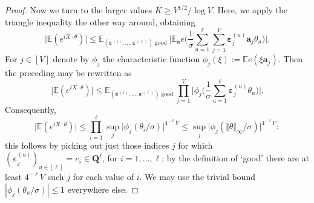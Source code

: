 \documentclass[11pt,reqno]{amsart}
\numberwithin{equation}{section}
\theoremstyle{definition}
\theoremstyle{remark}
\newcommand{\mb}{\mathbb}
\newcommand{\mbf}{\mathbf}
\newcommand{\eps}{\varepsilon}
\def\boldeps{\boldsymbol\eps}
\renewcommand{\le}{\leqslant}
\renewcommand{\ge}{\geqslant}
\begin{document}
\begin{proof}
Now we turn to the larger values $K \ge V^{1/2}/\log V$. Here, we apply the triangle inequality the other way around, obtaining
\begin{equation*} \big|\mb{E}(e^{i X \cdot \theta})\big|  \le \mb{E}_{(\boldeps^{(1)},\dots, \boldeps^{(\ell)}) \operatorname{good}} \Big| \mb{E}_{\mbf{a}} e\big( \frac{1}{\sigma} \sum_{u = 1}^{\ell} \sum_{j = 1}^V \boldeps_j^{(u)} \mbf{a}_j \theta_u \big) \Big|.\end{equation*}
For $j \in [V]$ denote by $\phi_j$ the characteristic function $\phi_j(\xi) := \mb{E} e(\xi \mbf{a}_j)$. Then the preceding may be rewritten as 
\[ \big|\mb{E}(e^{i X \cdot \theta})\big| \le \mb{E}_{(\boldeps^{(1)},\dots, \boldeps^{(\ell)}) \operatorname{good}} \prod_{j = 1}^V \Big| \phi_j\big(\frac{1}{\sigma}\sum_{u = 1}^{\ell} \boldeps_j^{(u)} \theta_u\big)\Big|.\]
Consequently, 
\begin{equation}\label{exp-avg-bd} \big|\mb{E}(e^{i X \cdot \theta})\big| \le \prod_{i= 1}^{\ell} \sup_j\big|\phi_j(\theta_i/\sigma)\big|^{4^{-\ell} V} \le \sup_j \big|\phi_j(\Vert \theta \Vert_{\infty}/\sigma)\big|^{4^{-\ell} V}:\end{equation} 
this follows by picking out just those indices $j$ for which $(\boldeps_j^{(u)})_{u \in [\ell]} = e_i \in \mbf{Q}^{\ell}$, for $i = 1,\dots, \ell$; by the definition of `good' there are at least $4^{-\ell} V$ such $j$ for each value of $i$. We may use the trivial bound $|\phi_j(\theta_u/\sigma)| \le 1$ everywhere else.


\end{proof}
\end{document}

